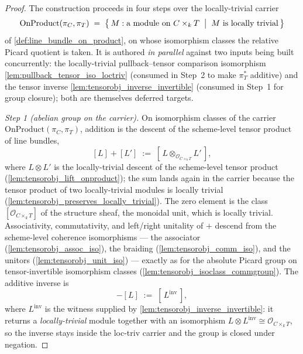 \begin{proof}




\leanok
  The construction proceeds in four steps over the locally-trivial carrier
  \[
    \mathrm{OnProduct}(\pi_C, \pi_T) \;=\;
      \bigl\{\, M : \text{a module on } C \times_k T \;\bigm|\;
      M \text{ is locally trivial} \,\bigr\}
  \]
  of \cref{def:line_bundle_on_product}, on whose isomorphism classes the
  relative Picard quotient is taken. It is authored \emph{in parallel} against
  two inputs being built concurrently: the locally-trivial pullback--tensor
  comparison isomorphism \cref{lem:pullback_tensor_iso_loctriv} (consumed in
  Step~2 to make \(\pi_T^*\) additive) and the tensor inverse
  \cref{lem:tensorobj_inverse_invertible} (consumed in Step~1 for group
  closure); both are themselves deferred targets.

  \emph{Step 1 (abelian group on the carrier).} On isomorphism classes of the
  carrier \(\mathrm{OnProduct}(\pi_C, \pi_T)\), addition is the descent of the
  scheme-level tensor product of line bundles,
  \[
    [L] + [L'] \;:=\; [\, L \otimes_{\mathcal{O}_{C \times_k T}} L' \,],
  \]
  where \(L \otimes L'\) is the locally-trivial descent of the scheme-level
  tensor product (\cref{lem:tensorobj_lift_onproduct}); the sum lands again in
  the carrier because the tensor product of two locally-trivial modules is
  locally trivial (\cref{lem:tensorobj_preserves_locally_trivial}). The zero
  element is the class \([\mathcal{O}_{C \times_k T}]\) of the structure sheaf,
  the monoidal unit, which is locally trivial. Associativity, commutativity,
  and left/right unitality of \(+\) descend from the scheme-level coherence
  isomorphisms --- the associator (\cref{lem:tensorobj_assoc_iso}), the
  braiding (\cref{lem:tensorobj_comm_iso}), and the unitors
  (\cref{lem:tensorobj_unit_iso}) --- exactly as for the absolute Picard group
  on tensor-invertible isomorphism classes
  (\cref{lem:tensorobj_isoclass_commgroup}). The additive inverse is
  \[
    -[L] \;:=\; [\, L^{\mathrm{inv}} \,],
  \]
  where \(L^{\mathrm{inv}}\) is the witness supplied by
  \cref{lem:tensorobj_inverse_invertible}: it returns a \emph{locally-trivial}
  module together with an isomorphism
  \(L \otimes L^{\mathrm{inv}} \cong \mathcal{O}_{C \times_k T}\), so the inverse
  stays inside the loc-triv carrier and the group is closed under negation.


\end{proof}
